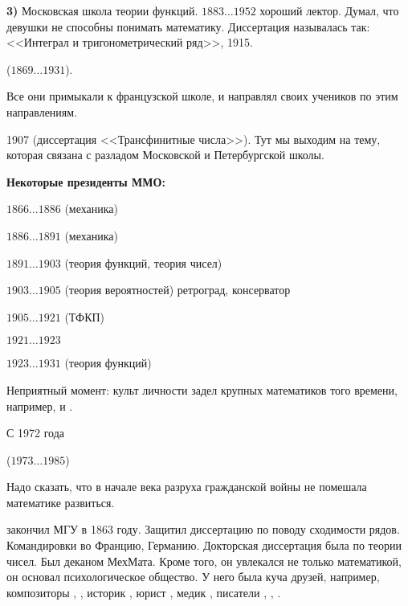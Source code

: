 \documentclass[a4paper,oneside,fleqn,10pt]{article}
\newcommand{\pe}[2]{${#1}\ldots{#2}$}
\begin{document}
\textbf{3)} Московская школа теории функций.
 \pe{1883}{1952} хороший лектор.
Думал, что девушки не способны понимать математику.
Диссертация  называлась так: <<Интеграл и тригонометрический ряд>>, 1915.

 (\pe{1869}{1931}).

Все они примыкали к французской школе, и 
направлял своих учеников по этим направлениям.

1907  (диссертация <<Трансфинитные числа>>). Тут мы выходим на тему, которая
связана с разладом Московской и Петербургской школы.

\textbf{Некоторые президенты ММО:}

\begin{items}{-2}
\item \pe{1866}{1886}  (механика)
\item \pe{1886}{1891}  (механика)
\item \pe{1891}{1903}  (теория функций, теория чисел)
\item \pe{1903}{1905}  (теория вероятностей) ретроград, консерватор
\item \pe{1905}{1921}  (ТФКП)
\item \pe{1921}{1923} 
\item \pe{1923}{1931}  (теория функций)

Неприятный момент: культ личности задел крупных математиков того времени,
например,  и .

\item С 1972 года 

\item {} (\pe{1973}{1985})
\end{items}

Надо сказать, что в начале века разруха гражданской войны не помешала
математике развиться.

 закончил МГУ в 1863 году. Защитил диссертацию по поводу сходимости рядов.
Командировки во Францию, Германию. Докторская диссертация была по теории чисел.
Был деканом МехМата. Кроме того, он увлекался не только математикой, он основал психологическое общество.
У него была куча друзей, например, композиторы , ,
историк , юрист , медик ,
писатели , , .
\end{document}
